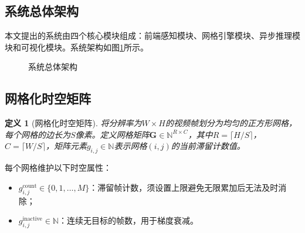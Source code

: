 \documentclass[10.5pt,a4paper,twoside,twocolumn]{ctexart}
\newtheorem{definition}{定义}[section]
\begin{document}
\subsection{系统总体架构}

本文提出的系统由四个核心模块组成：前端感知模块、网格引擎模块、异步推理模块和可视化模块。系统架构如图\ref{fig:architecture}所示。

\begin{figure}[H]
\centering
{}
\caption{系统总体架构}
\label{fig:architecture}
\end{figure}

\subsection{网格化时空矩阵}

\begin{definition}[网格化时空矩阵]
将分辨率为$W\times H$的视频帧划分为均匀的正方形网格，每个网格的边长为$S$像素。定义网格矩阵$\mathbf{G}\in\mathbb{N}^{R\times C}$，其中$R=\lceil H/S\rceil$，$C=\lceil W/S\rceil$，矩阵元素$g_{i,j}\in\mathbb{N}$表示网格$(i,j)$的当前滞留计数值。
\end{definition}

每个网格维护以下时空属性：
\begin{itemize}
\item $g_{i,j}^{\text{count}}\in\{0,1,\ldots,M\}$：滞留帧计数，须设置上限避免无限累加后无法及时消除；
\item $g_{i,j}^{\text{inactive}}\in\mathbb{N}$：连续无目标的帧数，用于梯度衰减。
\end{itemize}
\end{document}
